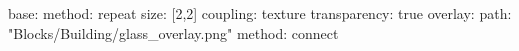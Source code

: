 base:
  method: repeat
  size: [2,2]
  coupling: texture
  transparency: true
overlay:
  path: "Blocks/Building/glass_overlay.png"
  method: connect